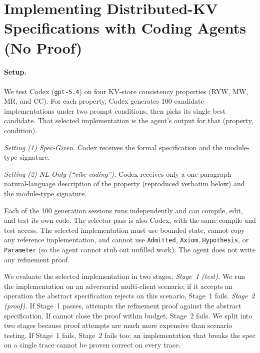 \section{Implementing Distributed-KV Specifications with Coding Agents \\(No Proof)}
\label{app:llm-only-synthesis}

\paragraph{Setup.}
We test Codex (\texttt{gpt-5.4}) on four KV-store consistency properties (RYW, MW, MR, and CC). For each property, Codex generates 100 candidate implementations under two prompt conditions, then picks its single best candidate. That selected implementation is the agent's output for that (property, condition).

\emph{Setting (1) Spec-Given.} Codex receives the formal \coq{} specification and the module-type signature.

\emph{Setting (2) NL-Only (``vibe coding'').} Codex receives only a one-paragraph natural-language description of the property (reproduced verbatim below) and the module-type signature.

Each of the 100 generation sessions runs independently and can compile, edit, and test its own code. The selector pass is also Codex, with the same compile and test access. The selected implementation must use bounded state, cannot copy any reference implementation, and cannot use \texttt{Admitted}, \texttt{Axiom}, \texttt{Hypothesis}, or \texttt{Parameter} (so the agent cannot stub out unfilled work). The agent does not write any refinement proof.

We evaluate the selected implementation in two stages.
\emph{Stage~1 (test).} We run the implementation on an adversarial multi-client scenario; if it accepts an operation the abstract specification rejects on this scenario, Stage~1 fails.
\emph{Stage~2 (proof).} If Stage~1 passes, \sys{} attempts the refinement proof against the abstract specification. If \sys{} cannot close the proof within budget, Stage~2 fails.
We split into two stages because proof attempts are much more expensive than scenario testing. If Stage~1 fails, Stage~2 fails too: an implementation that breaks the spec on a single trace cannot be proven correct on every trace.

